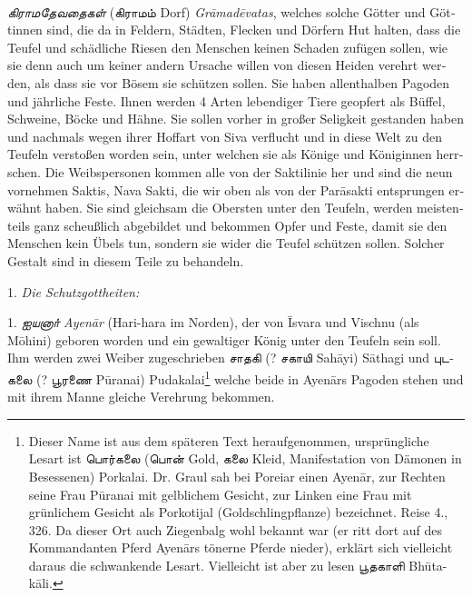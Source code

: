 \documentclass{article}
\newcommand{\TamilText}[1]{\texttamil{#1}}
\newcommand{\TamilItalic}[1]{\texttamil{\emph{#1}}}
\newcommand{\tam}[1]{\TamilText{#1}}
\newcommand{\tamitalic}[1]{\TamilItalic{#1}}
\begin{document}
{\paragraph{}
\tamitalic{கிராமதேவதைகள்} (\tam{கிராமம்} \textgerman{Dorf) \emph{Gr\={a}mad\={e}vatas}, welches solche Götter und Göttinnen sind, die da in Feldern, Städten, Flecken und Dörfern Hut halten, dass die Teufel und schädliche Riesen den Menschen keinen Schaden zufügen sollen, wie sie denn auch um keiner andern Ursache willen von diesen Heiden verehrt werden, als dass sie vor Bösem sie schützen sollen. Sie haben allenthalben Pagoden und jährliche Feste. Ihnen werden 4 Arten lebendiger Tiere geopfert als Büffel, Schweine, Böcke und Hähne. Sie sollen vorher in großer Seligkeit gestanden haben und nachmals wegen ihrer Hoffart von Siva verflucht und in diese Welt zu den Teufeln verstoßen worden sein, unter welchen sie als Könige und Königinnen herrschen. Die Weibspersonen kommen alle von der Saktilinie her und sind die neun vornehmen Saktis, Nava Sakti, die wir oben als von der Par\={a}sakti entsprungen erwähnt haben. Sie sind gleichsam die Obersten unter den Teufeln, werden meistenteils ganz scheußlich abgebildet und bekommen Opfer und Feste, damit sie den Menschen kein Übels tun, sondern sie wider die Teufel schützen sollen. Solcher Gestalt sind in diesem Teile zu behandeln.}

\bigskip

1. \emph{\textgerman{Die Schutzgottheiten:}}

\bigskip

1. \tamitalic{ஐயனாா்} \emph{\textgerman{Ayen\={a}r}} \textgerman{(Hari-hara im Norden), der von \={I}svara und Vischnu (als M\={o}hini) geboren worden und ein gewaltiger König unter den Teufeln sein soll. Ihm werden zwei Weiber zugeschrieben \tam{சாதகி} (? \tam{சகாயி} Sah\={a}yi) S\={a}thagi und \tam{புடகலை} (? \tam{பூரணை} P\={u}ranai) Pudakalai\footnote{Dieser Name ist aus dem späteren Text heraufgenommen, ursprüngliche Lesart ist \tam{பொர்கலை} (\tam{பொன்} Gold, \tam{கலை} Kleid, Manifestation von Dämonen in Besessenen) Porkalai. Dr. Graul sah bei Poreiar einen Ayen\={a}r, zur Rechten seine Frau P\={u}ranai mit gelblichem Gesicht, zur Linken eine Frau mit grünlichem Gesicht als Porkotijal (Goldschlingpflanze) bezeichnet. Reise 4., 326. Da dieser Ort auch Ziegenbalg wohl bekannt war (er ritt dort auf des Kommandanten Pferd Ayen\={a}rs tönerne Pferde nieder), erklärt sich vielleicht daraus die schwankende Lesart. Vielleicht ist aber zu lesen \tam{பூதகாளி} Bh\={u}ta-k\={a}li.} welche beide in Ayen\={a}rs Pagoden stehen und mit ihrem Manne gleiche Verehrung bekommen.}

}
\end{document}
